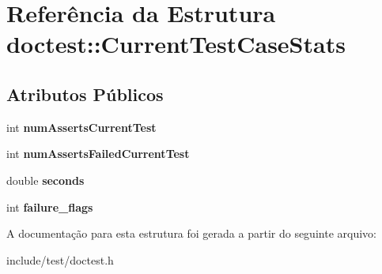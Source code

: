 \hypertarget{structdoctest_1_1CurrentTestCaseStats}{}\section{Referência da Estrutura doctest\+:\+:Current\+Test\+Case\+Stats}
\label{structdoctest_1_1CurrentTestCaseStats}
\subsection*{Atributos Públicos}
\begin{DoxyCompactItemize}
\item 
\mbox{\label{structdoctest_1_1CurrentTestCaseStats_ac8731bc4e8e32b86cf2940f4dcb61dec}} 
int {\bfseries num\+Asserts\+Current\+Test}
\item 
\mbox{\label{structdoctest_1_1CurrentTestCaseStats_a2fb52eed7bcef7322a816f418f0fb942}} 
int {\bfseries num\+Asserts\+Failed\+Current\+Test}
\item 
\mbox{\label{structdoctest_1_1CurrentTestCaseStats_a29b1963f1d624d9f939f404726298f48}} 
double {\bfseries seconds}
\item 
\mbox{\label{structdoctest_1_1CurrentTestCaseStats_aaa58c52fd07a20e6e4daf19eecb2e2ba}} 
int {\bfseries failure\+\_\+flags}
\end{DoxyCompactItemize}


A documentação para esta estrutura foi gerada a partir do seguinte arquivo\+:\begin{DoxyCompactItemize}
\item 
include/test/doctest.\+h\end{DoxyCompactItemize}
